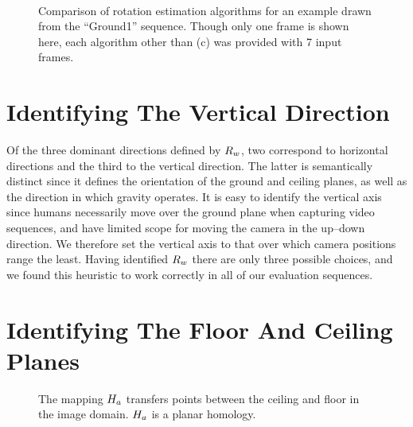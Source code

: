\begin{figure}[p]
  \centering
  \quad
  \\
  \quad
  \caption{Comparison of rotation estimation algorithms for an example
    drawn from the ``Ground1'' sequence. Though only one frame is
    shown here, each algorithm other than (c) was provided with 7
    input frames.}
  \label{fig:vpt-example3}
\end{figure}

\section{Identifying The Vertical Direction}
Of the three dominant directions defined by $\SceneR$, two correspond to
horizontal directions and the third to the vertical direction. The
latter is semantically distinct since it defines the orientation of
the ground and ceiling planes, as well as the direction in which
gravity operates. It is easy to identify the vertical axis since
humans necessarily move over the ground plane when capturing video
sequences, and have limited scope for moving the camera in the
up--down direction. We therefore set the vertical axis to that over
which camera positions range the least. Having identified $\SceneR$ there
are only three possible choices, and we found this heuristic to work
correctly in all of our evaluation sequences.

\section{Identifying The Floor And Ceiling Planes}
\label{sect:fcmap}

\begin{figure}[tb]
  \centering
  \quad
  \caption{The mapping $\Hcf$ transfers points between the ceiling and
    floor in the image domain. $\Hcf$ is a planar homology.}
  \label{fig:fcmap}
\end{figure}

